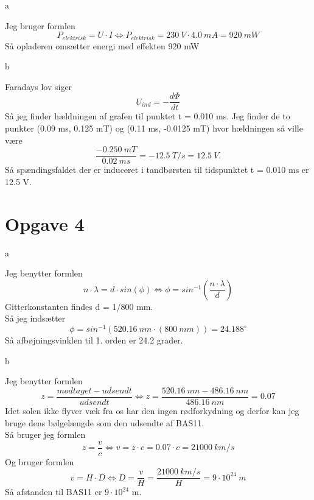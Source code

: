 \documentclass[12pt]{article}
\begin{document}
a

Jeg bruger formlen
$$P_{elektrisk} = U\cdot I \Leftrightarrow P_{elektrisk} = 230\ V \cdot 4.0\ mA = 920\ mW$$
Så opladeren omsætter energi med effekten 920 mW

b

Faradays lov siger
$$U_{ind} = -\frac{d\Phi}{dt}$$
Så jeg finder hældningen af grafen til punktet t = 0.010 ms. Jeg finder de to punkter (0.09 ms, 0.125 mT) og
(0.11 ms, -0.0125 mT) hvor hældningen så ville være
$$\frac{-0.250\ mT}{0.02\ ms} = -12.5\ T/s = 12.5\ V.$$
Så spændingsfaldet der er induceret i tandbørsten til tidspunktet t = 0.010 ms er 12.5 V.

\section*{Opgave 4}

a

Jeg benytter formlen
$$n\cdot \lambda = d\cdot sin(\phi) \Leftrightarrow \phi = sin^{-1} \left( \frac{n\cdot \lambda}{d} \right)$$
Gitterkonstanten findes d = 1/800 mm.\\
Så jeg indsætter
$$\phi = sin^{-1}(520.16\ nm \cdot (800\ mm)) = 24.188^{\circ}$$
Så afbøjningsvinklen til 1. orden er 24.2 grader.

b

Jeg benytter formlen
$$z = \frac{modtaget-udsendt}{udsendt} \Leftrightarrow z = \frac{520.16\ nm-486.16\ nm}{486.16\ nm} = 0.07$$
Idet solen ikke flyver væk fra os har den ingen rødforkydning og derfor kan jeg bruge dens bølgelængde som den udsendte af BAS11.\\
Så bruger jeg formlen
$$z = \frac{v}{c} \Leftrightarrow v = z\cdot c = 0.07\cdot c = 21000\ km/s$$
Og bruger formlen
$$v = H\cdot D \Leftrightarrow D = \frac{v}{H} = \frac{21000\ km/s}{H} = 9\cdot 10^{24}\ m$$
Så afstanden til BAS11 er $9\cdot 10^{24}$ m.
\end{document}
